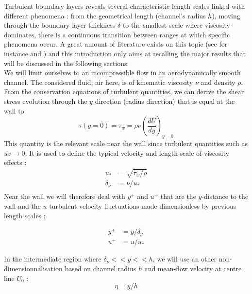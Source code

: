 \documentclass[12pt]{article}
\begin{document}
Turbulent boundary layers reveals several characteristic length scales linked with different phenomena : from the geometrical length (channel's radius $h$), moving through the boundary layer thickness $\delta$ to the smallest scale where viscosity dominates, there is a continuous transition between ranges at which specific phenomena occur. A great amount of literature exists on this topic (see for instance \cite{tennekesFirstCourseTurbulence1972} and \cite{popeTurbulentFlows2000a}) and this introduction only aims at recalling the major results that will be discussed in the following sections.\\

We will limit ourselves to an incompressible flow in an aerodynamically smooth channel. The considered fluid, air here, is of kinematic viscosity $\nu$ and density $\rho$. From the conservation equations of turbulent quantities, we can derive the shear stress evolution through the $y$ direction (radius direction) that is equal at the wall to
\begin{equation}
    \tau (y=0) = \tau_w = \rho \nu \left( \frac{d\bar{U}}{dy} \right)_{y=0}
\end{equation}
This quantity is the relevant scale near the wall since turbulent quantities such as $\overline{uv} \rightarrow 0$. It is used to define the typical velocity and length scale of viscosity effects :
\begin{align}
    u_* &= \sqrt{\tau_w/\rho} \\
    \delta_\nu &= \nu/u_* \\
\end{align}
Near the wall we will therefore deal with $y^+$ and $u^+$ that are the $y$-distance to the wall and the $u$ turbulent velocity fluctuations made dimensionless by previous length scales : 

\begin{align}
    y^+ &= y/\delta_\nu \\
    u^+ &= u/u_*
\end{align}

In the intermediate region where $ \delta_\nu << y << h$, we will use an other non-dimensionnalisation based on channel radius $h$ and mean-flow velocity at centre line $U_0$ :
\begin{equation}
    \eta = y/h
\end{equation}
\end{document}
